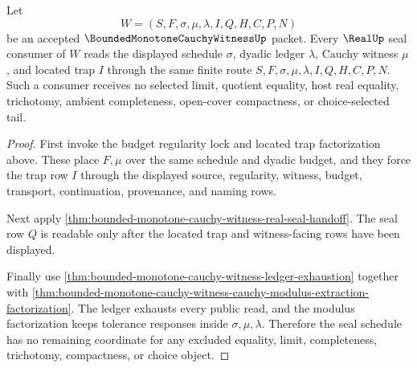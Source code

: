 \begin{theorem}
\label{thm:bounded-monotone-cauchy-witness-real-seal-schedule-exhaustion}
Let
$$
W=(S,F,\sigma,\mu,\lambda,I,Q,H,C,P,N)
$$
be an accepted $\BoundedMonotoneCauchyWitnessUp$ packet. Every $\RealUp$ seal consumer of $W$ reads the displayed schedule $\sigma$, dyadic ledger $\lambda$, Cauchy witness $\mu$, and located trap $I$ through the same finite route $S,F,\sigma,\mu,\lambda,I,Q,H,C,P,N$. Such a consumer receives no selected limit, quotient equality, host real equality, trichotomy, ambient completeness, open-cover compactness, or choice-selected tail.
\end{theorem}
\begin{proof}
First invoke the budget regularity lock and located trap factorization above. These place $F,\mu$ over the same schedule and dyadic budget, and they force the trap row $I$ through the displayed source, regularity, witness, budget, transport, continuation, provenance, and naming rows.

Next apply \autoref{thm:bounded-monotone-cauchy-witness-real-seal-handoff}. The seal row $Q$ is readable only after the located trap and witness-facing rows have been displayed.

Finally use \autoref{thm:bounded-monotone-cauchy-witness-ledger-exhaustion} together with \autoref{thm:bounded-monotone-cauchy-witness-cauchy-modulus-extraction-factorization}. The ledger exhausts every public read, and the modulus factorization keeps tolerance responses inside $\sigma,\mu,\lambda$. Therefore the seal schedule has no remaining coordinate for any excluded equality, limit, completeness, trichotomy, compactness, or choice object.
\end{proof}

